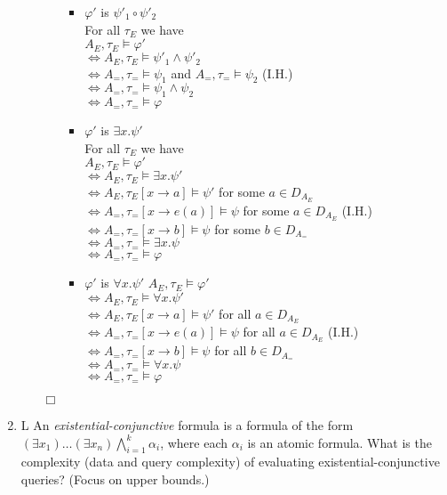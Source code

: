 \documentclass[12pt]{article}
\renewcommand{\phi}{\varphi}
\begin{document}
\begin{enumerate}
\begin{itemize}
\begin{itemize}
\begin{itemize}
			\item $\phi'$ is $\psi'_1\circ\psi'_2$\\
			For all $\tau_E$ we have\\
				$A_E,\tau_E\models \phi'$\\
			$\Leftrightarrow A_E,\tau_E\models\psi'_1\wedge\psi'_2$\\
			$\Leftrightarrow A_=,\tau_=\models\psi_1$ and $ A_=,\tau_=\models\psi_2$ (I.H.)\\
			$\Leftrightarrow A_=,\tau_=\models \psi_1\wedge\psi_2$ \\
			$\Leftrightarrow A_=,\tau_=\models \phi$
			\item $\phi'$ is $\exists x. \psi'$\\
			For all $\tau_E$ we have\\
				$A_E,\tau_E\models \phi'$\\
					$\Leftrightarrow A_E,\tau_E\models \exists x.\psi'$\\
						$\Leftrightarrow A_E,\tau_E[x\to a]\models \psi'$ for some $a\in D_{A_E}$\\
							$\Leftrightarrow A_=,\tau_=[x\to e(a)]\models \psi$ for some $a\in D_{A_E}$ (I.H.)\\
								$\Leftrightarrow A_=,\tau_=[x\to b]\models \psi$ for some $b\in D_{A_=}$\\
								$\Leftrightarrow A_=,\tau_=\models \exists x.\psi$\\
									$\Leftrightarrow A_=,\tau_=\models \phi$\\
			\item $\phi'$ is $\forall x. \psi'$
				$A_E,\tau_E\models \phi'$\\
				$\Leftrightarrow A_E,\tau_E\models \forall x.\psi'$\\
				$\Leftrightarrow A_E,\tau_E[x\to a]\models \psi'$ for all $a\in D_{A_E}$\\
				$\Leftrightarrow A_=,\tau_=[x\to e(a)]\models \psi$ for all $a\in D_{A_E}$ (I.H.)\\
				$\Leftrightarrow A_=,\tau_=[x\to b]\models \psi$ for all $b\in D_{A_=}$\\
				$\Leftrightarrow A_=,\tau_=\models \forall x.\psi$\\
				$\Leftrightarrow A_=,\tau_=\models \phi$\\
		\end{itemize}
		\end{itemize}
		$\Box$ 
		\end{itemize}
	
		\item
		L An {\em existential-conjunctive\/} formula is a formula of the form
		$(\exists x_1) \ldots (\exists x_n) \bigwedge_{i=1}^k \alpha_i$,
		where each $\alpha_i$ is an atomic formula. What is the complexity
		(data and query complexity) of evaluating existential-conjunctive queries? 
		(Focus on upper bounds.)
		

\end{enumerate}
\end{document}
